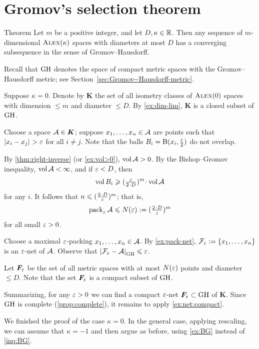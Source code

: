 \section{Gromov's selection theorem}

\begin{thm}{Theorem}\label{thm:gromov-compactness}
Let $m$ be a positive integer, and let $D,\kappa\in\mathbb{R}$.
Then any sequence of $m$-dimensional $\textup{\textsc{Alex}}(\kappa)$ spaces with diameters at most $D$
has a converging subsequence in the sense of Gromov--Hausdorff.
\end{thm}

Recall that $\operatorname{\rm GH}\nolimits$ denotes the space of compact metric spaces with the Gromov--Hausdorff metric; see Section~\ref{sec:Gromov--Hausdorff-metric}.

Suppose $\kappa=0$.
Denote by $\bm{K}$ the set of all isometry classes of $\textup{\textsc{Alex}}(0)$ spaces with dimension $\le m$ and diameter $\le D$.
By \ref{ex:dim-lim}, $\bm{K}$ is a closed subset of $\operatorname{\rm GH}\nolimits$.

Choose a space $\mathcal{A}\in \bm{K}$;
suppose $x_1,\dots,x_n\in \mathcal{A}$ are points such that $\dist{x_i}{x_j}{}> \eps$ for all $i\ne j$.
Note that the balls $B_i=\mathrm{B}{}(x_i,\tfrac{\varepsilon}2)$ do not overlap.

By \ref{thm:right-inverse} (or \ref{ex:vol>0}), $\operatorname{\rm vol}\nolimits \mathcal{A}>0$.
By the Bishop--Gromov inequality, $\vol \spc{A}\z<\infty$,
and if $\varepsilon<D$, then 
\[\vol B_i\ge (\tfrac\eps{2\cdot D})^m\cdot\vol \spc{A}\]
for any $i$.
It follows that $n\le (\tfrac{2\cdot D}\eps)^m$;
that is, 
\[\pack_\eps\spc{A}\le N(\eps)\df(\tfrac{2\cdot D}\eps)^m\]
for all small $\varepsilon>0$.

Choose a maximal $\varepsilon$-packing $x_1,\z\dots,x_n\in \spc{A}$.
By \ref{ex:pack-net}, $\spc{F}_\eps\z\df\{x_1,\z\dots,x_n\}$ is an $\varepsilon$-net of $\mathcal{A}$.
Observe that $\dist{\spc{F}_\eps}{\spc{A}}{\GH}\le \eps$.

Let $\bm{F}_\varepsilon$ be the set of all metric spaces with
at most $N(\varepsilon)$ points
and
diameter $\le D$.
Note that the set $\bm{F}_\varepsilon$ is a compact subset of $\operatorname{\rm GH}\nolimits$.

Summarizing, for any $\varepsilon>0$ we can find a compact $\varepsilon$-net $\bm{F}_\varepsilon\subset \operatorname{\rm GH}\nolimits$ of $\bm{K}$.
Since $\operatorname{\rm GH}\nolimits$ is complete (\ref{prop:complete}), it remains to apply \ref{ex:net:compact}.

We finished the proof of the case $\kappa=0$.
In the general case, applying rescaling, we can assume that $\kappa=-1$ and then argue as before, using \ref{ex:BG} instead of \ref{inq:BG}.
\qeds


